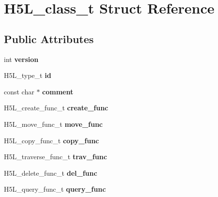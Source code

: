 \hypertarget{struct_h5_l__class__t}{}\section{H5\+L\+\_\+class\+\_\+t Struct Reference}
\label{struct_h5_l__class__t}
\subsection*{Public Attributes}
\begin{DoxyCompactItemize}
\item 
\mbox{\label{struct_h5_l__class__t_a01ea413354b1df478448a86236a0c40d}} 
int {\bfseries version}
\item 
\mbox{\label{struct_h5_l__class__t_af1ff5e0708eb9bc4bdc4b79d08ee7886}} 
H5\+L\+\_\+type\+\_\+t {\bfseries id}
\item 
\mbox{\label{struct_h5_l__class__t_a7a4db6310af8142ee815e43fadbfe3a9}} 
const char $\ast$ {\bfseries comment}
\item 
\mbox{\label{struct_h5_l__class__t_ada01a2ff3534ace29d10b744f13f2e72}} 
H5\+L\+\_\+create\+\_\+func\+\_\+t {\bfseries create\+\_\+func}
\item 
\mbox{\label{struct_h5_l__class__t_a83bce235cc76cfe81ac4f6ca3f50b220}} 
H5\+L\+\_\+move\+\_\+func\+\_\+t {\bfseries move\+\_\+func}
\item 
\mbox{\label{struct_h5_l__class__t_ad76d7466839d48a094a07214504ad791}} 
H5\+L\+\_\+copy\+\_\+func\+\_\+t {\bfseries copy\+\_\+func}
\item 
\mbox{\label{struct_h5_l__class__t_a6bc4220d46a470f6819299cdfa9e7305}} 
H5\+L\+\_\+traverse\+\_\+func\+\_\+t {\bfseries trav\+\_\+func}
\item 
\mbox{\label{struct_h5_l__class__t_ad635ccb15d9d2f2ec10d984b3672a559}} 
H5\+L\+\_\+delete\+\_\+func\+\_\+t {\bfseries del\+\_\+func}
\item 
\mbox{\label{struct_h5_l__class__t_a861a2ffe5ab0cc5549fd43aac6030ad1}} 
H5\+L\+\_\+query\+\_\+func\+\_\+t {\bfseries query\+\_\+func}
\end{DoxyCompactItemize}


